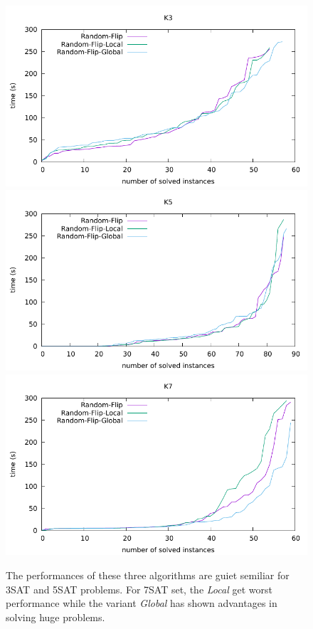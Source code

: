 \documentclass[12pt,a4paper,twoside]{scrartcl}
\numberwithin{equation}{section}
\begin{document}
  \begin{figure}[H]
\begin{center}
  \includegraphics[scale = 0.8]{DATA/K3/e3r.pdf}
  \includegraphics[scale = 0.8]{DATA/K5/e3r.pdf}
    \includegraphics[scale = 0.8]{DATA/K7/e3r.pdf}
    \caption{
The performances of these three algorithms are guiet semiliar for 3SAT and 5SAT problems.  For 7SAT set, the \emph{Local} get worst performance while the variant \emph{Global} has shown  advantages in solving huge problems.}
  \end{center}
  \end{figure}
  \clearpage  
  
\end{document}
